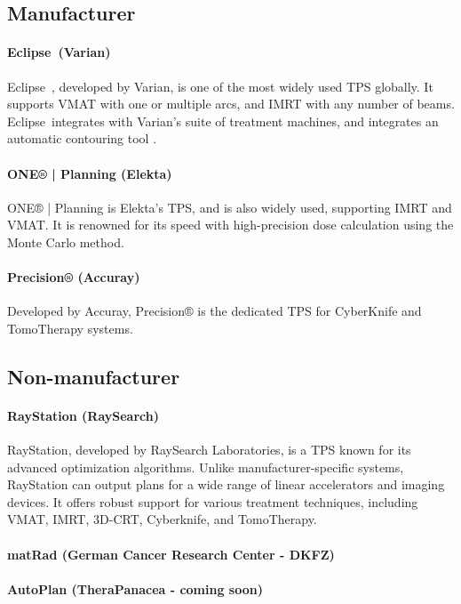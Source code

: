 \subsection{Manufacturer}
\paragraph{Eclipse\texttrademark\ (Varian)}
Eclipse\texttrademark\ \cite{eclipse}, developed by Varian, is one of the most widely used TPS globally.
It supports VMAT with one or multiple arcs, and IMRT with any number of beams.
Eclipse\texttrademark\ integrates with Varian's suite of treatment machines, and integrates an automatic contouring tool \cite{eclipse_brochure}.

\paragraph{ONE® | Planning (Elekta)}
ONE® | Planning \cite{one_planning} is Elekta's TPS, and is also widely used, supporting IMRT and VMAT.
It is renowned for its speed with high-precision dose calculation using the Monte Carlo method.

\paragraph{Precision® (Accuray)}
Developed by Accuray, Precision® \cite{precision} is the dedicated TPS for CyberKnife and TomoTherapy systems.

\subsection{Non-manufacturer}
\paragraph{RayStation (RaySearch)}
RayStation, developed by RaySearch Laboratories, is a TPS known for its advanced optimization algorithms.
Unlike manufacturer-specific systems, RayStation can output plans for a wide range of linear accelerators and imaging devices.
It offers robust support for various treatment techniques, including VMAT, IMRT, 3D-CRT, Cyberknife, and TomoTherapy.

\paragraph{matRad (German Cancer Research Center - DKFZ)}
\paragraph{AutoPlan (TheraPanacea - coming soon)}

